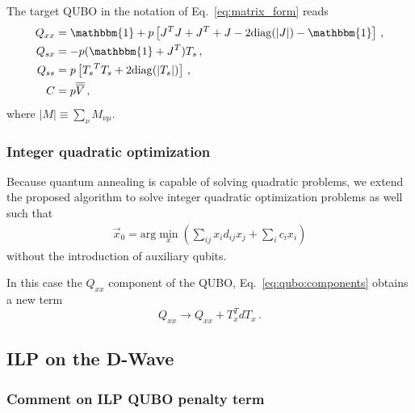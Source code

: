 \documentclass[prd,twocolumn,tightenlines,preprintnumbers,showpacs,superscriptaddress,notitlepage,nofootinbib,eqsecnum,floatfix,longbibliography,aps,10pt]{revtex4-2}
\begin{document}
The target QUBO in the notation of Eq.~\eqref{eq:matrix_form} reads
 {\small
  \begin{align}
   Q_{xx} & = \mathbbm{1} + p\left[J^T J + J^T + J - 2 \mathrm{diag}(|J|) - \mathbbm{1} \right] \,, \\
   Q_{sx} & = - p(\mathbbm{1}+J^T)T_s\,,                                                                     \\
   Q_{ss} & = p\left[{T_s}^T T_s + 2\mathrm{diag}(|T_s|)\right]\,,                                  \\
   C      & =  p \overline{\overline{V}}\,,
  \end{align}}
where $ |M| \equiv \sum_{\nu} M_{\nu \mu}$.

\subsubsection{Integer quadratic optimization}
\label{sec:methods:ilp:quadratic}

Because quantum annealing is capable of solving quadratic problems, we extend the proposed algorithm to solve integer quadratic optimization problems as well such that
\begin{align}
 \vec x_0 = \mathrm{arg}\min\limits_{x}\left(\sum_{ij} x_i d_{ij} x_j + \sum_i c_i x_i\right)
\end{align}
without the introduction of auxiliary qubits.

In this case the $Q_{xx}$ component of the QUBO, Eq.~\eqref{eq:qubo:components} obtains a new term
\begin{equation}
    Q_{xx} \to Q_{xx} + T_x^T d T_x \, .
\end{equation}

\subsection{ILP on the D-Wave}
\label{sec:methods:ILP-on-D-Wave}

\subsubsection{Comment on ILP QUBO penalty term}
\label{sec:methods:ilp-qubo-comments}
\end{document}
